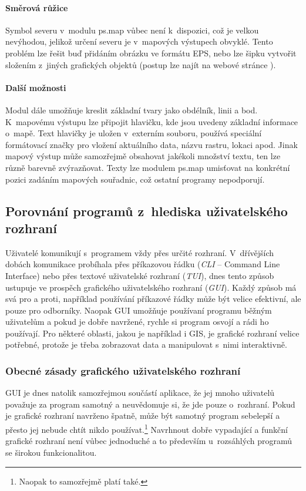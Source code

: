 \documentclass[a4paper,12pt,draft]{article}
\begin{document}
\paragraph*{Směrová růžice}
Symbol severu v~modulu ps.map vůbec není k~dispozici, což je velkou
nevýhodou, jelikož určení severu je v~mapových výstupech obvyklé. Tento
problém lze řešit buď přidáním obrázku ve formátu EPS, nebo
lze šipku vytvořit složením z~jiných grafických objektů (postup lze
najít na webové stránce \cite{wiki_psmap_north}).

\paragraph*{Další možnosti}
Modul dále umožňuje kreslit základní tvary jako obdélník, linii a
bod. K~mapovému výstupu lze připojit hlavičku, kde jsou uvedeny základní
informace o~mapě. Text hlavičky je uložen v~externím souboru, používá
speciální formátovací značky pro vložení aktuálního data, názvu
rastru, lokaci apod. Jinak  mapový výstup může samozřejmě obsahovat
jakékoli množství textu, ten lze různě barevně zvýrazňovat. Texty lze
modulem ps.map umisťovat na konkrétní pozici zadáním mapových
souřadnic, což ostatní programy nepodporují.




\subsection{Porovnání programů  z~hlediska uživatelského rozhraní}
Uživatelé komunikují s~programem vždy přes určité rozhraní.
V~dřívějších dobách komunikace probíhala přes příkazovou
řádku (\emph{CLI} -- Command Line Interface) nebo přes textové uživatelské
rozhraní (\emph{TUI}), dnes tento způsob ustupuje ve prospěch grafického
uživatelského
rozhraní (\emph{GUI}). Každý způsob má svá pro a proti, například
používání příkazové řádky může být velice efektivní, ale pouze
pro odborníky. Naopak GUI umožňuje používaní programu běžným
uživatelům a pokud je dobře navržené, rychle si program osvojí a
rádi ho používají. Pro některé oblasti, jakou je například i GIS,
je grafické rozhraní velice potřebné, protože je třeba zobrazovat data
a manipulovat s~nimi interaktivně.

\subsubsection{Obecné zásady grafického uživatelského rozhraní}
\label{sec:GUI_zasady}
GUI je dnes natolik samozřejmou součástí aplikace, že jej mnoho
uživatelů považuje za program samotný a neuvědomuje si, že jde
pouze o~rozhraní. Pokud je grafické rozhraní navrženo špatně,
může být samotný program sebelepší a přesto jej nebude chtít nikdo
používat.\footnote{Naopak to samozřejmě platí také.} Navrhnout dobře
vypadající a funkční grafické rozhraní není vůbec jednoduché a to
především u~rozsáhlých programů se širokou funkcionalitou.
\end{document}
